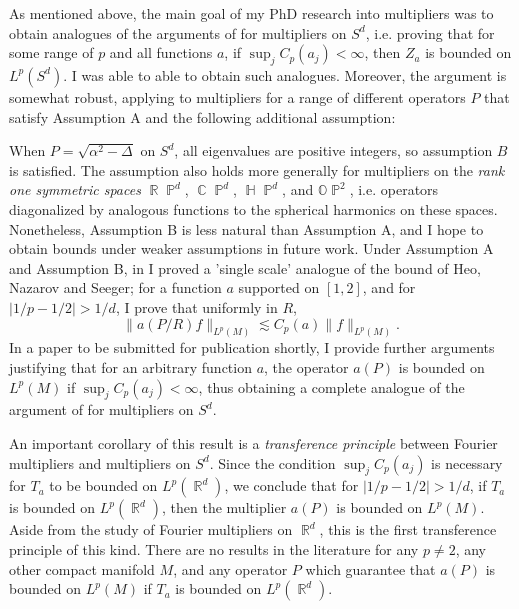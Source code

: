 \documentclass[11pt]{article}
\DeclareMathOperator{\RR}{\mathbb{R}}
\DeclareMathOperator{\HH}{\mathbb{H}}
\DeclareMathOperator{\CC}{\mathbb{C}}
\DeclareMathOperator{\PP}{\mathbb{P}}
\begin{document}
As mentioned above, the main goal of my PhD research into multipliers was to obtain analogues of the arguments of \cite{HeoNazarovSeeger,Cladek,KimQuasiradial} for multipliers on $S^d$, i.e. proving that for some range of $p$ and all functions $a$, if $\sup_j C_p(a_j) < \infty$, then $Z_a$ is bounded on $L^p(S^d)$. I was able to able to obtain such analogues. Moreover, the argument is somewhat robust, applying to multipliers for a range of different operators $P$ that satisfy Assumption A and the following additional assumption:
%
\begin{center}
\end{center}
%
When $P = \sqrt{\alpha^2 - \Delta}$ on $S^d$, all eigenvalues are positive integers, so assumption $B$ is satisfied. The assumption also holds more generally for multipliers on the \emph{rank one symmetric spaces} $\RR \PP^d$, $\CC \PP^d$, $\HH \PP^d$, and $\mathbb{O} \PP^2$, i.e. operators diagonalized by analogous functions to the spherical harmonics on these spaces. Nonetheless, Assumption B is less natural than Assumption A, and I hope to obtain bounds under weaker assumptions in future work. Under Assumption A and Assumption B, in \cite{DensonCharacterization} I proved a 'single scale' analogue of the bound of Heo, Nazarov and Seeger; for a function $a$ supported on $[1,2]$, and for $|1/p - 1/2| > 1/d$, I prove that uniformly in $R$,
%
\[ \| a(P/R) f \|_{L^p(M)} \lesssim C_p(a) \| f \|_{L^p(M)}. \]
%
In a paper to be submitted for publication shortly, I provide further arguments justifying that for an arbitrary function $a$, the operator $a(P)$ is bounded on $L^p(M)$ if $\sup_j C_p(a_j) < \infty$, thus obtaining a complete analogue of the argument of \cite{HeoNazarovSeeger} for multipliers on $S^d$.

An important corollary of this result is a \emph{transference principle} between Fourier multipliers and multipliers on $S^d$. Since the condition $\sup_j C_p(a_j)$ is necessary for $T_a$ to be bounded on $L^p(\RR^d)$, we conclude that for $|1/p - 1/2| > 1/d$, if $T_a$ is bounded on $L^p(\RR^d)$, then the multiplier $a(P)$ is bounded on $L^p(M)$. Aside from the study of Fourier multipliers on $\RR^d$, this is the first transference principle of this kind. There are no results in the literature for any $p \neq 2$, any other compact manifold $M$, and any operator $P$ which guarantee that $a(P)$ is bounded on $L^p(M)$ if $T_a$ is bounded on $L^p(\RR^d)$.
\end{document}
